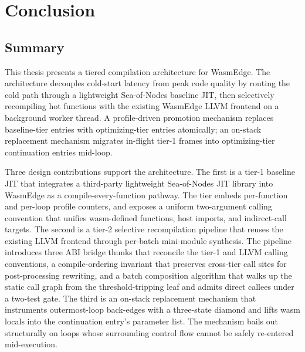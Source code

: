 
\chapter{Conclusion}
\label{ch:conclusion}

\section{Summary}
\label{sec:conclusion:summary}

This thesis presents a tiered compilation architecture for WasmEdge. The architecture decouples cold-start latency from peak code quality by routing the cold path through a lightweight Sea-of-Nodes baseline JIT, then selectively recompiling hot functions with the existing WasmEdge LLVM frontend on a background worker thread. A profile-driven promotion mechanism replaces baseline-tier entries with optimizing-tier entries atomically; an on-stack replacement mechanism migrates in-flight tier-1 frames into optimizing-tier continuation entries mid-loop.

Three design contributions support the architecture. The first is a tier-1 baseline JIT that integrates a third-party lightweight Sea-of-Nodes JIT library into WasmEdge as a compile-every-function pathway. The tier embeds per-function and per-loop profile counters, and exposes a uniform two-argument calling convention that unifies wasm-defined functions, host imports, and indirect-call targets. The second is a tier-2 selective recompilation pipeline that reuses the existing LLVM frontend through per-batch mini-module synthesis. The pipeline introduces three ABI bridge thunks that reconcile the tier-1 and LLVM calling conventions, a compile-ordering invariant that preserves cross-tier call sites for post-processing rewriting, and a batch composition algorithm that walks up the static call graph from the threshold-tripping leaf and admits direct callees under a two-test gate. The third is an on-stack replacement mechanism that instruments outermost-loop back-edges with a three-state diamond and lifts wasm locals into the continuation entry's parameter list. The mechanism bails out structurally on loops whose surrounding control flow cannot be safely re-entered mid-execution.


